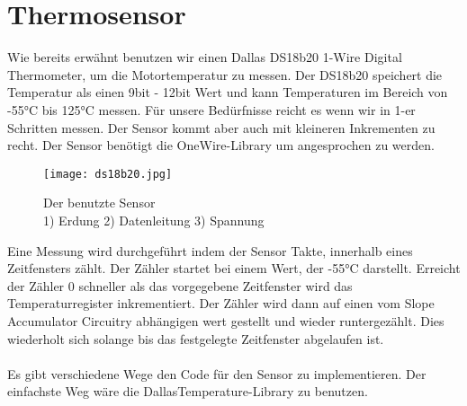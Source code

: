 \documentclass[12pt]{article}
\begin{document}
\newpage
\section{Thermosensor} %
Wie bereits erwähnt benutzen wir einen Dallas DS18b20  1-Wire Digital Thermometer, um die Motortemperatur zu messen. Der DS18b20 speichert die Temperatur als einen 9bit - 12bit Wert und kann Temperaturen im Bereich von -55°C bis 125°C messen. Für unsere Bedürfnisse reicht es wenn wir in 1-er Schritten messen. Der Sensor kommt aber auch mit kleineren Inkrementen zu recht. Der Sensor benötigt die OneWire-Library um angesprochen zu werden.\\

\begin{figure}[h]
	\texttt{[image: ds18b20.jpg]}
	\centering
	\caption{Der benutzte Sensor \\1) Erdung 2) Datenleitung 3) Spannung}
\end{figure}
Eine Messung wird durchgeführt indem der Sensor Takte, innerhalb eines Zeitfensters zählt. Der Zähler startet bei einem Wert, der -55°C darstellt. Erreicht der Zähler 0 schneller als das vorgegebene Zeitfenster wird das Temperaturregister inkrementiert. Der Zähler wird dann auf einen vom Slope Accumulator Circuitry abhängigen wert gestellt und wieder runtergezählt. Dies wiederholt sich solange bis das festgelegte Zeitfenster abgelaufen ist. \\
\\
Es gibt verschiedene Wege den Code für den Sensor zu implementieren. Der einfachste Weg wäre die DallasTemperature-Library zu benutzen.
\end{document}
